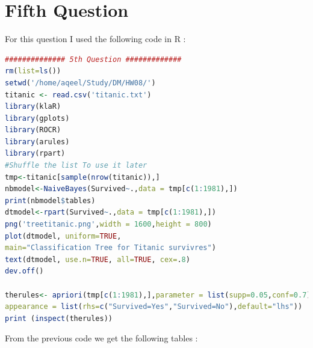 \documentclass{article}
\begin{document}
\section*{Fifth Question}
For this question I used the following code in R : 
\begin{lstlisting}[language=R]
############## 5th Question #############
rm(list=ls())
setwd('/home/aqeel/Study/DM/HW08/')
titanic <- read.csv('titanic.txt')
library(klaR)
library(gplots)
library(ROCR)
library(arules)
library(rpart)
#Shuffle the list To use it later
tmp<-titanic[sample(nrow(titanic)),]
nbmodel<-NaiveBayes(Survived~.,data = tmp[c(1:1981),])
print(nbmodel$tables)
dtmodel<-rpart(Survived~.,data = tmp[c(1:1981),])
png('treetitanic.png',width = 1600,height = 800)
plot(dtmodel, uniform=TRUE,
main="Classification Tree for Titanic survivres")
text(dtmodel, use.n=TRUE, all=TRUE, cex=.8)
dev.off()

therules<- apriori(tmp[c(1:1981),],parameter = list(supp=0.05,conf=0.7),
appearance = list(rhs=c("Survived=Yes","Survived=No"),default="lhs"))
print (inspect(therules))
\end{lstlisting}
From the previous code we get the following tables :\\
\end{document}
